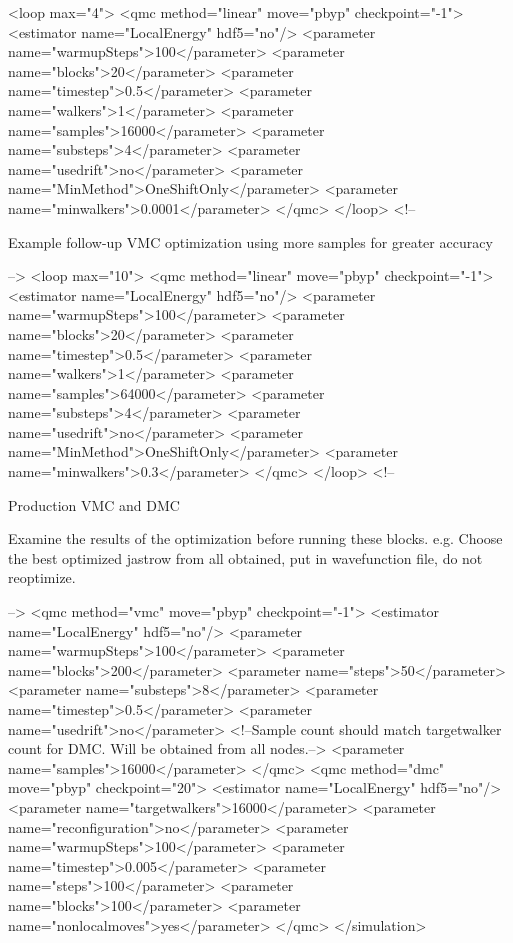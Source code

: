 \begin{itemize}
\begin{shade}
  <loop max="4">
    <qmc method="linear" move="pbyp" checkpoint="-1">
      <estimator name="LocalEnergy" hdf5="no"/>
      <parameter name="warmupSteps">100</parameter>
      <parameter name="blocks">20</parameter>
      <parameter name="timestep">0.5</parameter>
      <parameter name="walkers">1</parameter>
      <parameter name="samples">16000</parameter>
      <parameter name="substeps">4</parameter>
      <parameter name="usedrift">no</parameter>
      <parameter name="MinMethod">OneShiftOnly</parameter>
      <parameter name="minwalkers">0.0001</parameter>
    </qmc>
  </loop>
  <!--
 
Example follow-up VMC optimization using more samples for greater accuracy

-->
  <loop max="10">
    <qmc method="linear" move="pbyp" checkpoint="-1">
      <estimator name="LocalEnergy" hdf5="no"/>
      <parameter name="warmupSteps">100</parameter>
      <parameter name="blocks">20</parameter>
      <parameter name="timestep">0.5</parameter>
      <parameter name="walkers">1</parameter>
      <parameter name="samples">64000</parameter>
      <parameter name="substeps">4</parameter>
      <parameter name="usedrift">no</parameter>
      <parameter name="MinMethod">OneShiftOnly</parameter>
      <parameter name="minwalkers">0.3</parameter>
    </qmc>
  </loop>
  <!--

Production VMC and DMC

Examine the results of the optimization before running these blocks.
e.g. Choose the best optimized jastrow from all obtained, put in 
wavefunction file, do not reoptimize.

-->
  <qmc method="vmc" move="pbyp" checkpoint="-1">
    <estimator name="LocalEnergy" hdf5="no"/>
    <parameter name="warmupSteps">100</parameter>
    <parameter name="blocks">200</parameter>
    <parameter name="steps">50</parameter>
    <parameter name="substeps">8</parameter>
    <parameter name="timestep">0.5</parameter>
    <parameter name="usedrift">no</parameter>
    <!--Sample count should match targetwalker count for 
      DMC. Will be obtained from all nodes.-->
    <parameter name="samples">16000</parameter>
  </qmc>
  <qmc method="dmc" move="pbyp" checkpoint="20">
    <estimator name="LocalEnergy" hdf5="no"/>
    <parameter name="targetwalkers">16000</parameter>
    <parameter name="reconfiguration">no</parameter>
    <parameter name="warmupSteps">100</parameter>
    <parameter name="timestep">0.005</parameter>
    <parameter name="steps">100</parameter>
    <parameter name="blocks">100</parameter>
    <parameter name="nonlocalmoves">yes</parameter>
  </qmc>
</simulation>


\end{shade}
\end{itemize}
